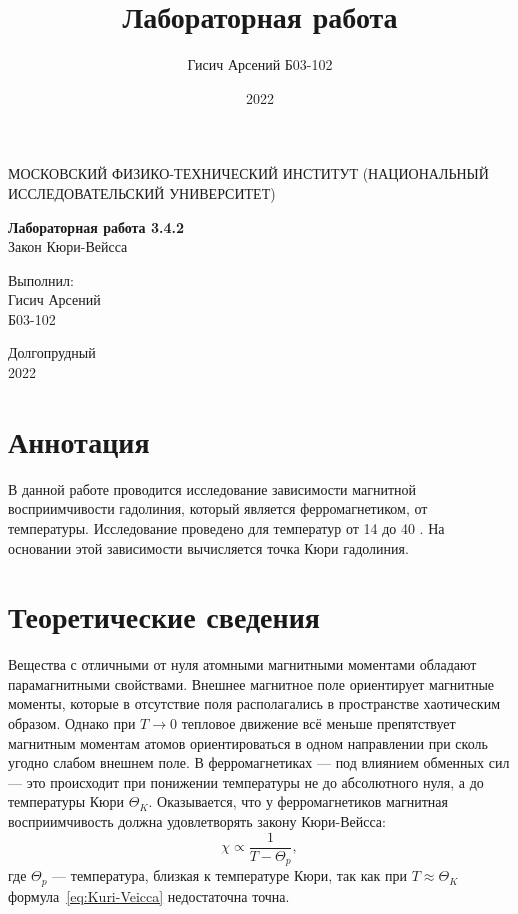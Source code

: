 \documentclass[a4paper, 12pt]{article}
\title{Лабораторная работа}
\author{Гисич Арсений Б03-102}
\date{2022}
\begin{document}
	\begin{center}
		{\large МОСКОВСКИЙ ФИЗИКО-ТЕХНИЧЕСКИЙ ИНСТИТУТ (НАЦИОНАЛЬНЫЙ ИССЛЕДОВАТЕЛЬСКИЙ УНИВЕРСИТЕТ)}
	\end{center}
	\vspace{5 cm}
	{\Large
		\begin{center}
			{\bf Лабораторная работа 3.4.2}\\[0.2 cm]
			Закон Кюри-Вейсса
		\end{center}
	}
	\vspace{4 cm}
	\begin{flushright}
		{\Large Выполнил: \\
			\vspace{0.2 cm}
			Гисич Арсений \\
			\vspace{0.2 cm}
			Б03-102 \\}
	\end{flushright}
	\vspace{9 cm}
	\begin{center}
		Долгопрудный\\[0.1 cm]
		2022
	\end{center}
\thispagestyle{empty}

\section{Аннотация}

В данной работе проводится исследование зависимости магнитной восприимчивости гадолиния, который является ферромагнетиком, от температуры. Исследование проведено для температур от 14 до 40 \textcelsius. На основании этой зависимости вычисляется точка Кюри гадолиния.

\section{Теоретические сведения}

Вещества с отличными от нуля атомными магнитными моментами обладают парамагнитными свойствами. Внешнее магнитное поле ориентирует магнитные моменты, которые в отсутствие поля располагались в пространстве хаотическим образом. Однако при $T \rightarrow 0$ тепловое движение всё меньше препятствует магнитным моментам атомов ориентироваться в одном направлении при сколь угодно слабом внешнем поле. В ферромагнетиках --- под влиянием обменных сил --- это происходит при понижении температуры не до абсолютного нуля, а до температуры Кюри $\Theta_K$. Оказывается, что у ферромагнетиков магнитная восприимчивость должна удовлетворять закону Кюри-Вейсса:
\begin{equation} \label{eq:Kuri-Veicca}
	\chi \propto \frac{1}{T-\Theta_p},
\end{equation}
где $\Theta_p$ --- температура, близкая к температуре Кюри, так как при $T \approx \Theta_K$ формула~\eqref{eq:Kuri-Veicca} недостаточна точна.
\end{document}
